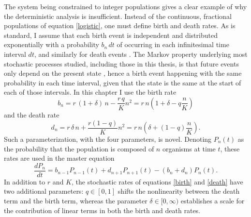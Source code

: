 The system being constrained to integer populations gives a clear example of why the deterministic analysis is insufficient. 
Instead of the continuous, fractional populations of equation \ref{logistic}, one must define birth and death rates. 
As is standard, I assume that each birth event is independent and distributed exponentially with a probability $b_n\,dt$ of occurring in each infinitesimal time interval $dt$, and similarly for death events \cite{Nisbet1982,Gardiner2004,VanKampen1992}. 
The Markov property underlying most stochastic processes studied, including those in this thesis, is that future events only depend on the present state \cite{Nisbet1982,Gardiner2004,VanKampen1992}, hence a birth event happening with the same probability in each time interval, given that the state is the same at the start of each of those intervals. 
In this chapter I use the birth rate
\begin{equation}
b_n = r\,(1 + \delta)\,n - \frac{r\,q}{K}n^2 = r\,n\left(1+\delta-q\frac{n}{K}\right)
\label{birth}
\end{equation}
and the death rate
\begin{equation}
d_n = r\,\delta\,n + \frac{r(1-q)}{K} n^2 = r\,n\left(\delta+(1-q)\frac{n}{K}\right).
\label{death}
\end{equation}
Such a parameterization, with the four parameters, is novel. 
Denoting $P_n(t)$ as the probability that the population is composed of $n$ organisms at time $t$, these rates are used in the master equation
\begin{equation}
\frac{dP_n}{dt} =  b_{n-1}P_{n-1}(t) + d_{n+1}P_{n+1}(t) - (b_n+d_n)P_n(t).
 \label{master-eqn}
\end{equation}
In addition to $r$ and $K$, the stochastic rates of equations \ref{birth} and \ref{death} have two additional parameters: $q\in[0,1]$ shifts the nonlinearity between the death term and the birth term, whereas the parameter $\delta\in[0,\infty)$ establishes a scale for the contribution of linear terms in both the birth and death rates. 
